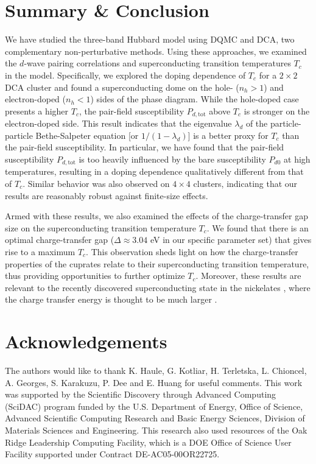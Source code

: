 \documentclass[reprint,nofootinbib,nobibnotes,amsmath,amssymb,aps,prb,floatfix]{revtex4-2}
\begin{document}
\section{Summary  \& Conclusion}
We have studied the three-band Hubbard model using DQMC and DCA, two complementary non-perturbative methods. Using these approaches, we examined the $d$-wave pairing correlations and superconducting transition temperatures $T_c$ in the model.  
Specifically, we explored the doping dependence of $T_c$ for a $2\times2$ DCA cluster and found a superconducting dome on the hole- ($n_h>1$) and electron-doped ($n_h<1$) sides of the phase diagram. While the hole-doped case presents a higher $T_c$, the pair-field susceptibility $P_{d,\text{tot}}$ above $T_c$ is stronger on the electron-doped side. This result indicates that the  eigenvalue $\lambda_d$ of the particle-particle Bethe-Salpeter equation [or $1/(1-\lambda_d)$] is a better proxy for $T_c$ than the pair-field susceptibility. In particular, we have found that the pair-field susceptibility $P_{d,\text{tot}}$ is too heavily influenced by the bare susceptibility $P_{d0}$ at high temperatures, resulting in a doping dependence qualitatively different from that of $T_c$. Similar behavior was also observed on $4\times4$ clusters, indicating that our results are reasonably robust against finite-size effects.   

Armed with these results, we also examined the effects of the charge-transfer gap size on the superconducting transition temperature $T_c$. We found that there is an optimal charge-transfer gap ($\Delta\approx3.04$ eV in our specific parameter set) that gives rise to a maximum $T_c$. This observation sheds light on how the charge-transfer properties of the cuprates relate to their superconducting transition temperature, thus providing opportunities to further optimize $T_c$.  Moreover, these results are  relevant to the recently discovered superconducting state in the nickelates \cite{Li}, where the charge transfer energy is thought to be much larger \cite{Li, Jiang}. 

\section{Acknowledgements} The authors would like to thank K. Haule, G. Kotliar, H. Terletska, L. Chioncel, A. Georges, S. Karakuzu, P. Dee and E. Huang for useful comments. This work was supported by the Scientific Discovery through Advanced Computing (SciDAC) program funded by the U.S. Department of Energy, Office of Science, Advanced Scientific Computing Research and Basic Energy Sciences, Division of Materials Sciences and Engineering. This research also used resources of the Oak Ridge Leadership Computing Facility, which is a DOE Office of Science User Facility supported under Contract DE-AC05-00OR22725.
\end{document}
